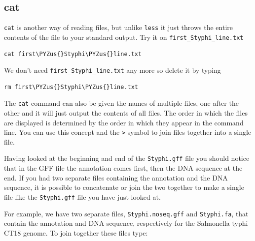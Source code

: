\documentclass[11pt]{article}
\makeatletter
\def\PYZus{\char`\_}
\newcommand{\boxspacing}{\kern\kvtcb@left@rule\kern\kvtcb@boxsep}
\newcommand{\prompt}[4]{
        {\ttfamily\llap{{\color{blue}\LARGE\faKeyboardO\hspace{3pt}#4}}\vspace{-\baselineskip}}
    }
\makeatother
\begin{document}
    \hypertarget{cat}{%
\subsection{cat}\label{cat}}

\texttt{cat} is another way of reading files, but unlike \texttt{less}
it just throws the entire contents of the file to your standard output.
Try it on \texttt{first\_Styphi\_line.txt}

    \begin{tcolorbox}[breakable, size=fbox, boxrule=1pt, pad at break*=1mm,colback=cellbackground, colframe=cellborder]
\prompt{In}{incolor}{ }{\boxspacing}
\begin{Verbatim}[commandchars=\\\{\}]
cat first\PYZus{}Styphi\PYZus{}line.txt
\end{Verbatim}
\end{tcolorbox}

    We don't need \texttt{first\_Styphi\_line.txt} any more so delete it by
typing

    \begin{tcolorbox}[breakable, size=fbox, boxrule=1pt, pad at break*=1mm,colback=cellbackground, colframe=cellborder]
\prompt{In}{incolor}{ }{\boxspacing}
\begin{Verbatim}[commandchars=\\\{\}]
rm first\PYZus{}Styphi\PYZus{}line.txt
\end{Verbatim}
\end{tcolorbox}

    The \texttt{cat} command can also be given the names of multiple files,
one after the other and it will just output the contents of all files.
The order in which the files are displayed is determined by the order in
which they appear in the command line. You can use this concept and the
\texttt{\textgreater{}} symbol to join files together into a single
file.

Having looked at the beginning and end of the \texttt{Styphi.gff} file
you should notice that in the GFF file the annotation comes first, then
the DNA sequence at the end. If you had two separate files containing
the annotation and the DNA sequence, it is possible to concatenate or
join the two together to make a single file like the \texttt{Styphi.gff}
file you have just looked at.

For example, we have two separate files, \texttt{Styphi.noseq.gff} and
\texttt{Styphi.fa}, that contain the annotation and DNA sequence,
respectively for the Salmonella typhi CT18 genome. To join together
these files type:
\end{document}
